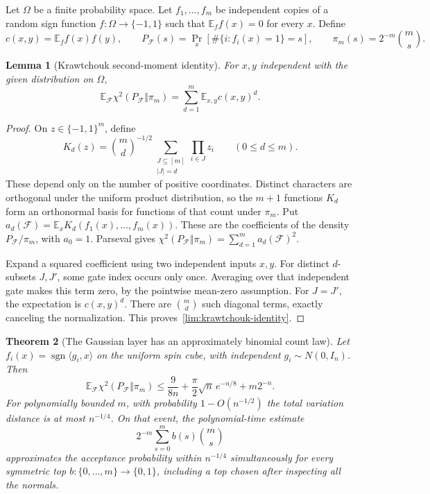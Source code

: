 \documentclass[11pt,letterpaper]{article}
\newtheorem{theorem}{Theorem}[section]
\newtheorem{lemma}[theorem]{Lemma}
\theoremstyle{definition}
\theoremstyle{remark}
\begin{document}
Let $\Omega$ be a finite probability space.  Let $f_1,\ldots,f_m$ be
independent copies of a random sign function $f:\Omega\to\{-1,1\}$ such
that $\mathbb E_f f(x)=0$ for every $x$.  Define
\[
 c(x,y)=\mathbb E_f f(x)f(y),\qquad
 P_{
 \mathcal F}(s)=\Pr_x[\#\{i:f_i(x)=1\}=s],\qquad
 \pi_m(s)=2^{-m}\binom ms.
\]

\begin{lemma}[Krawtchouk second-moment identity]
\label{lim:krawtchouk}
For $x,y$ independent with the given distribution on $\Omega$,
\begin{equation}
 \mathbb E_{\mathcal F}\chi^2(P_{\mathcal F}\Vert\pi_m)
 =\sum_{d=1}^m\mathbb E_{x,y}c(x,y)^d.
 \label{lim:krawtchouk-identity}
\end{equation}
\end{lemma}

\begin{proof}
On $z\in\{-1,1\}^m$, define
\[
 K_d(z)=\binom md^{-1/2}
               \sum_{\substack{J\subseteq[m]\\|J|=d}}
                    \prod_{i\in J}z_i\qquad(0\le d\le m).
\]
These depend only on the number of positive coordinates.  Distinct
characters are orthogonal under the uniform product distribution, so the
$m+1$ functions $K_d$ form an orthonormal basis for functions of that count
under $\pi_m$.  Put
$a_d(\mathcal F)=\mathbb E_xK_d(f_1(x),\ldots,f_m(x))$.
These are the coefficients of the density $P_{\mathcal F}/\pi_m$,
with $a_0=1$.  Parseval gives
$\chi^2(P_{\mathcal F}\Vert\pi_m)=\sum_{d=1}^m a_d(\mathcal F)^2$.

Expand a squared coefficient using two independent inputs $x,y$.
For distinct $d$-subsets $J,J'$, some gate index occurs only once.
Averaging over that independent gate makes this term zero, by the
pointwise mean-zero assumption.  For $J=J'$, the expectation is
$c(x,y)^d$.  There are $\binom md$ such diagonal terms, exactly canceling
the normalization.  This proves~\eqref{lim:krawtchouk-identity}.
\end{proof}

\begin{theorem}[The Gaussian layer has an approximately binomial count law]
\label{lim:gaussian-law}
Let $f_i(x)=\operatorname{sgn}\langle g_i,x\rangle$ on the uniform spin
cube, with independent $g_i\sim N(0,I_n)$.  Then
\begin{equation}
 \mathbb E_{\mathcal F}\chi^2(P_{\mathcal F}\Vert\pi_m)
 \le \frac9{8n}+\frac\pi2\sqrt n\,e^{-n/8}+m2^{-n}.
 \label{lim:gaussian-chi}
\end{equation}
For polynomially bounded $m$, with probability $1-O(n^{-1/2})$ the
total variation distance is at most $n^{-1/4}$.  On that event, the
polynomial-time estimate
\begin{equation}
 2^{-m}\sum_{s=0}^m b(s)\binom ms
 \label{lim:binomial-estimator}
\end{equation}
approximates the acceptance probability within $n^{-1/4}$ simultaneously
for every symmetric top $b:\{0,\ldots,m\}\to\{0,1\}$, including a top
chosen after inspecting all the normals.
\end{theorem}
\end{document}
